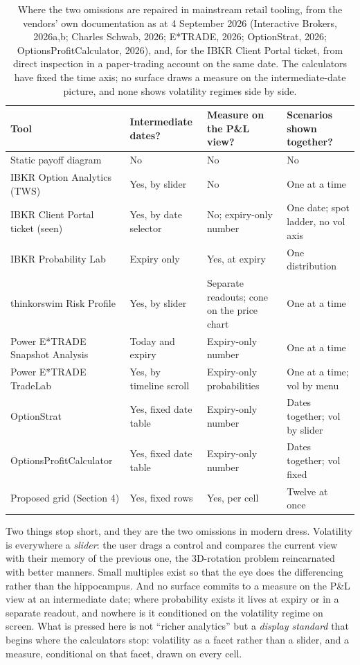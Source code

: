 \documentclass[11pt,a4paper]{article}
\newcommand{\PnL}{P\&L}
\begin{document}
\begin{table}[htbp]
\centering\small
\caption{Where the two omissions are repaired in mainstream retail tooling, from the vendors' own documentation as at 4 September 2026 (Interactive Brokers, 2026a,b; Charles Schwab, 2026; E*TRADE, 2026; OptionStrat, 2026; OptionsProfitCalculator, 2026), and, for the IBKR Client Portal ticket, from direct inspection in a paper-trading account on the same date. The calculators have fixed the time axis; no surface draws a measure on the intermediate-date picture, and none shows volatility regimes side by side.}
\begin{tabular}{@{}L{3.75cm}L{3.0cm}L{3.0cm}L{3.75cm}@{}}
\toprule
Tool & Intermediate dates? & Measure on the \PnL{} view? & Scenarios shown together? \\
\midrule
Static payoff diagram & No & No & No \\
IBKR Option Analytics (TWS) & Yes, by slider & No & One at a time \\
IBKR Client Portal ticket (seen) & Yes, by date selector & No; expiry-only number & One date; spot ladder, no vol axis \\
IBKR Probability Lab & Expiry only & Yes, at expiry & One distribution \\
thinkorswim Risk Profile & Yes, by slider & Separate readouts; cone on the price chart & One at a time \\
Power E*TRADE Snapshot Analysis & Today and expiry & Expiry-only number & One at a time \\
Power E*TRADE TradeLab & Yes, by timeline scroll & Expiry-only probabilities & One at a time; vol by menu \\
OptionStrat & Yes, fixed date table & Expiry-only number & Dates together; vol by slider \\
OptionsProfitCalculator & Yes, fixed date table & Expiry-only number & Dates together; vol fixed \\
Proposed grid (Section 4) & Yes, fixed rows & Yes, per cell & Twelve at once \\
\bottomrule
\end{tabular}
\end{table}

Two things stop short, and they are the two omissions in modern dress. Volatility is everywhere a \emph{slider}: the user drags a control and compares the current view with their memory of the previous one, the 3D-rotation problem reincarnated with better manners. Small multiples exist so that the eye does the differencing rather than the hippocampus. And no surface commits to a measure on the \PnL{} view at an intermediate date; where probability exists it lives at expiry or in a separate readout, and nowhere is it conditioned on the volatility regime on screen. What is pressed here is not ``richer analytics'' but a \emph{display standard} that begins where the calculators stop: volatility as a facet rather than a slider, and a measure, conditional on that facet, drawn on every cell.
\end{document}
